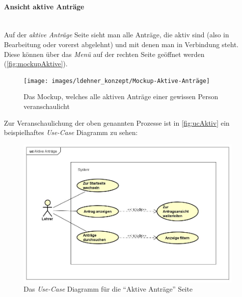 \paragraph{Ansicht aktive Anträge}
~\\
Auf der \textit{aktive Anträge} Seite sieht man alle Anträge, die aktiv sind (also in Bearbeitung oder vorerst abgelehnt) und mit denen man in Verbindung steht. Diese können über das \textit{Menü} auf der rechten Seite geöffnet werden (\autoref{fig:mockupAktive}).
\begin{figure}[H]
	\centering
	\texttt{[image: images/ldehner\_konzept/Mockup-Aktive-Anträge]}
	\caption[Mokup aktive Anträge]{Das Mockup, welches alle aktiven Anträge einer gewissen Person veranschaulicht}
	\label{fig:mockupAktive}
\end{figure}
Zur Veranschaulichung der oben genannten Prozesse ist in \autoref{fig:ucAktiv} ein beispielhaftes \textit{Use-Case} Diagramm zu sehen: 
\begin{figure}[H]
	\centering
	\includegraphics[width=1\linewidth]{images/ldehner_konzept/uc-active}
	\caption[\textit{Use-Case} Diagramm Aktive Anträge]{Das \textit{Use-Case} Diagramm für die \enquote{Aktive Anträge} Seite}
	\label{fig:ucAktiv}
\end{figure}
\newpage
